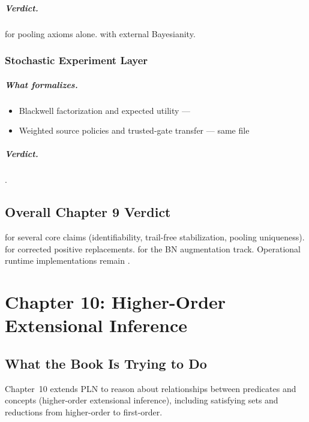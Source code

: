 \documentclass[11pt,openany]{report}
\begin{document}
\paragraph{Verdict.}
\verdictNoGo{} for pooling axioms alone.
\verdictAssumption{} with external Bayesianity.

\subsection{Stochastic Experiment Layer}

\paragraph{What formalizes.}
\begin{itemize}
\item Blackwell factorization and expected utility ---
\item Weighted source policies and trusted-gate transfer ---
  same file
\end{itemize}

\paragraph{Verdict.}
\verdictClean{}.

\section{Overall Chapter 9 Verdict}

\verdictNoGo{} for several core claims (identifiability, trail-free
stabilization, pooling uniqueness).  \verdictAssumption{} for
corrected positive replacements.  \verdictClean{} for the BN
augmentation track.  Operational runtime implementations remain
\verdictHeuristic{}.


\chapter{Chapter 10: Higher-Order Extensional Inference}
\label{ch:review-ch10}

\section{What the Book Is Trying to Do}

Chapter~10 extends PLN to reason about relationships between predicates
and concepts (higher-order extensional inference), including satisfying
sets and reductions from higher-order to first-order.
\end{document}
